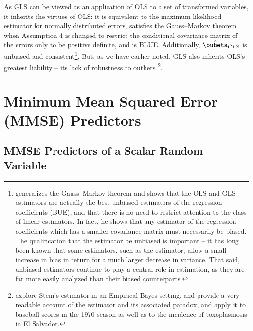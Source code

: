 \documentclass[graybox,envcountchap,sectrefs]{svmono}\usepackage[]{graphicx}\usepackage[]{xcolor}
\begin{document}
\begin{appendices}
As GLS can be viewed as an application of OLS to a set of transformed
variables, it inherits the virtues of OLS: it is equivalent to the
maximum likelihood estimator for normally distributed errors, satisfies
the Gauss--Markov theorem when Assumption 4 is changed to restrict
the conditional covariance matrix of the errors only to be positive
definite, and is BLUE. Additionally, $\hat{\bubeta}_{GLS}$ is unbiased
and consistent\footnote{\citet{Hansen2021} generalizes the Gauss--Markov theorem and shows
that the OLS and GLS estimators are actually the best unbiased estimators
of the regression coefficients (BUE), and that there is no need to
restrict attention to the class of linear estimators. In fact, he
shows that any estimator of the regression coefficients which has
a smaller covariance matrix must necessarily be biased. The qualification
that the estimator be unbiased is important -- it has long been known
that some estimators, such as the \citet{JamesStein1961} estimator,
allow a small increase in bias in return for a much larger decrease
in variance. That said, unbiased estimators continue to play a central
role in estimation, as they are far more easily analyzed than their
biased counterparts.}. But, as we have earlier noted, GLS also inherits OLS's greatest
liability -- its lack of robustness to outliers \footnote{\citet{EfronMorris1973} explore Stein's estimator in an Empirical
Bayes setting, and \citet{EfronMorris1977} provide a very readable
account of the estimator and its associated paradox, and apply it
to baseball scores in the 1970 season as well as to the incidence
of toxoplasmosis in El Salvador.}. 

\section{Minimum Mean Squared Error (MMSE) Predictors\label{sec:MMSEPredictors}}


\subsection{MMSE Predictors of a Scalar Random Variable\label{subsec:MMSEPredictors}}


\end{appendices}
\end{document}
